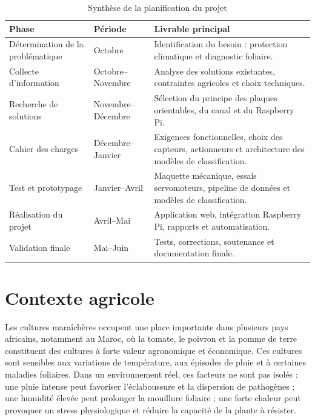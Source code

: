 ﻿\documentclass[11pt,a4paper,openany]{report}
\begin{document}
\begin{table}[H]
\centering
\small
\renewcommand{\arraystretch}{1.35}

\begin{tabular}{|p{3.5cm}|p{2.8cm}|p{7cm}|}
\hline
\textbf{Phase} &
\textbf{Période} &
\textbf{Livrable principal} \\
\hline

Détermination de la problématique &
Octobre &
Identification du besoin : protection climatique et diagnostic foliaire. \\
\hline

Collecte d'information &
Octobre--Novembre &
Analyse des solutions existantes, contraintes agricoles et choix techniques. \\
\hline

Recherche de solutions &
Novembre--Décembre &
Sélection du principe des plaques orientables, du canal et du Raspberry Pi. \\
\hline

Cahier des charges &
Décembre--Janvier &
Exigences fonctionnelles, choix des capteurs, actionneurs et architecture des modèles de classification. \\
\hline

Test et prototypage &
Janvier--Avril &
Maquette mécanique, essais servomoteurs, pipeline de données et modèles de classification. \\
\hline

Réalisation du projet &
Avril--Mai &
Application web, intégration Raspberry Pi, rapports et automatisation. \\
\hline

Validation finale &
Mai--Juin &
Tests, corrections, soutenance et documentation finale. \\
\hline

\end{tabular}

\caption{Synthèse de la planification du projet}
\label{tab:planning}
\end{table}

\section{Contexte agricole}
Les cultures maraîchères occupent une place importante dans plusieurs pays africains, notamment au Maroc, où la tomate, le poivron et la pomme de terre constituent des cultures à forte valeur agronomique et économique. Ces cultures sont sensibles aux variations de température, aux épisodes de pluie et à certaines maladies foliaires. Dans un environnement réel, ces facteurs ne sont pas isolés : une pluie intense peut favoriser l'éclaboussure et la dispersion de pathogènes ; une humidité élevée peut prolonger la mouillure foliaire ; une forte chaleur peut provoquer un stress physiologique et réduire la capacité de la plante à résister.
\end{document}
